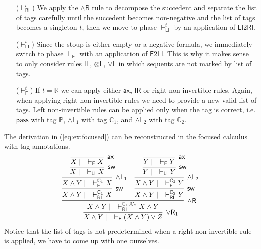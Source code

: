 \documentclass[submission,copyright,creativecommons]{eptcs}
\theoremstyle{definition}
\newcommand{\tl}{\otimes \mathsf{L}}
\newcommand{\pass}{\mathsf{pass}}
\newcommand{\unitl}{\mathsf{IL}}
\newcommand{\unitr}{\mathsf{IR}}
\newcommand{\andlone}{\land \mathsf{L}_{1}}
\newcommand{\andltwo}{\land \mathsf{L}_{2}}
\newcommand{\andr}{\land \mathsf{R}}
\newcommand{\orl}{\lor \mathsf{L}}
\newcommand{\orrone}{\lor \mathsf{R}_{1}}
\newcommand{\ax}{\mathsf{ax}}
\newcommand{\RI}{\mathsf{RI}}
\newcommand{\LI}{\mathsf{LI}}
\newcommand{\Pass}{\mathsf{P}}
\newcommand{\F}{\mathsf{F}}
\newcommand{\sw}{\mathsf{sw}}
\newcommand{\tP}{\mathbb{P}}
\newcommand{\tCone}{\mathbb{C}_1}
\newcommand{\tCtwo}{\mathbb{C}_2}
\newcommand{\tE}{\mathbb{R}}
\begin{document}
\begin{itemize}
  \item[($\vdash^{l}_{\RI}$)] We apply the $\andr$ rule to decompose the succedent and separate the list of tags carefully until the succedent becomes non-negative and the list of tags becomes a singleton $t$, then we move to phase $\vdash_\LI^t$ by an application of $\LI2 \RI$.
  \item[($\vdash^{t}_{\LI}$)] Since the stoup is either empty or a negative formula, we immediately switch to phase $\vdash_\F$ with an application of $\F 2 \LI$. This is why it makes sense to only consider rules $\unitl$, $\tl$, $\orl$ in which sequents are not marked by list of tags.
  \item[($\vdash^{t}_{\F}$)] If $t = \tE$ we can apply either $\ax$, $\unitr$ or right non-invertible rules. Again, when applying right non-invertible rules we need to provide a new valid list of tags.
  Left non-invertible rules can be applied only when the tag is correct, i.e. $\pass$ with tag $\tP$, $\andlone$ with tag $\tCone$, and $\andltwo$ with tag $\tCtwo$.
\end{itemize}
The derivation in (\ref{eq:ex:focused}) can be reconstructed in the focused calculus with tag annotations.
\begin{equation}\label{eq:ex:tag:focused}
  \begin{array}{c}
  \infer[\orrone]{X \land Y \mid \quad \vdash_{\F} (X \land Y) \lor Z}{
    \infer[\andr]{X \land Y \mid \quad \vdash^{\tCone , \tCtwo}_{\RI} X \land Y}{
      \infer[\sw]{X \land Y \mid \quad \vdash^{\tCone}_{\RI} X}{
        \infer[\andlone]{X \land Y \mid \quad \vdash^{\tCone}_{\F} X}{
          \infer[\sw]{X \mid \quad \vdash_{\LI} X}{
            \infer[\ax]{X \mid \quad \vdash_{\F} X}{}
          }
        }
      }
      &
      \infer[\sw]{X \land Y \mid \quad \vdash^{\tCtwo}_{\RI} Y}{
        \infer[\andltwo]{X \land Y \mid \quad \vdash^{\tCtwo}_{\F} Y}{
          \infer[\sw]{Y \mid \quad \vdash_{\LI} Y}{
            \infer[\ax]{Y \mid \quad \vdash_{\F} Y}{}
          }
        }
      }
    }
  }
  \end{array}
\end{equation}
Notice that the list of tags is not predetermined when a right non-invertible rule is applied, we have to come up with one ourselves.
\end{document}

